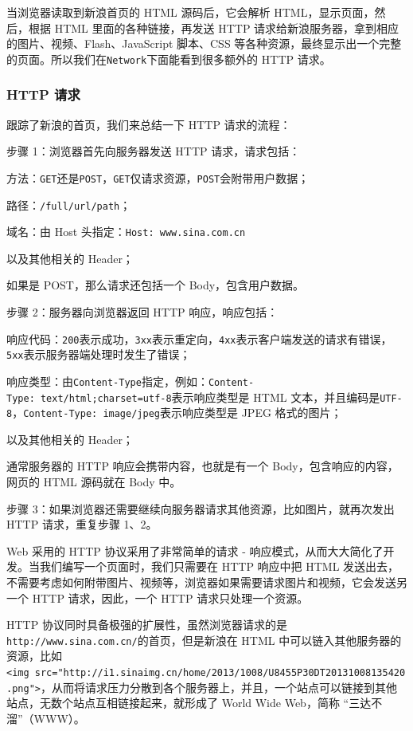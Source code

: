 当浏览器读取到新浪首页的 HTML 源码后，它会解析
HTML，显示页面，然后，根据 HTML 里面的各种链接，再发送 HTTP
请求给新浪服务器，拿到相应的图片、视频、Flash、JavaScript 脚本、CSS
等各种资源，最终显示出一个完整的页面。所以我们在\texttt{Network}下面能看到很多额外的
HTTP 请求。

\hypertarget{http-ux8bf7ux6c42}{%
\subsubsection{HTTP 请求}\label{http-ux8bf7ux6c42}}

跟踪了新浪的首页，我们来总结一下 HTTP 请求的流程：

步骤 1：浏览器首先向服务器发送 HTTP 请求，请求包括：

方法：\texttt{GET}还是\texttt{POST}，\texttt{GET}仅请求资源，\texttt{POST}会附带用户数据；

路径：\texttt{/full/url/path}；

域名：由 Host 头指定：\texttt{Host:\ www.sina.com.cn}

以及其他相关的 Header；

如果是 POST，那么请求还包括一个 Body，包含用户数据。

步骤 2：服务器向浏览器返回 HTTP 响应，响应包括：

响应代码：\texttt{200}表示成功，\texttt{3xx}表示重定向，\texttt{4xx}表示客户端发送的请求有错误，\texttt{5xx}表示服务器端处理时发生了错误；

响应类型：由\texttt{Content-Type}指定，例如：\texttt{Content-Type:\ text/html;charset=utf-8}表示响应类型是
HTML
文本，并且编码是\texttt{UTF-8}，\texttt{Content-Type:\ image/jpeg}表示响应类型是
JPEG 格式的图片；

以及其他相关的 Header；

通常服务器的 HTTP 响应会携带内容，也就是有一个
Body，包含响应的内容，网页的 HTML 源码就在 Body 中。

步骤 3：如果浏览器还需要继续向服务器请求其他资源，比如图片，就再次发出
HTTP 请求，重复步骤 1、2。

Web 采用的 HTTP 协议采用了非常简单的请求 -
响应模式，从而大大简化了开发。当我们编写一个页面时，我们只需要在 HTTP
响应中把 HTML
发送出去，不需要考虑如何附带图片、视频等，浏览器如果需要请求图片和视频，它会发送另一个
HTTP 请求，因此，一个 HTTP 请求只处理一个资源。

HTTP
协议同时具备极强的扩展性，虽然浏览器请求的是\texttt{http://www.sina.com.cn/}的首页，但是新浪在
HTML
中可以链入其他服务器的资源，比如\texttt{\textless{}img\ src="http://i1.sinaimg.cn/home/2013/1008/U8455P30DT20131008135420.png"\textgreater{}}，从而将请求压力分散到各个服务器上，并且，一个站点可以链接到其他站点，无数个站点互相链接起来，就形成了
World Wide Web，简称 ``三达不溜''（WWW）。

